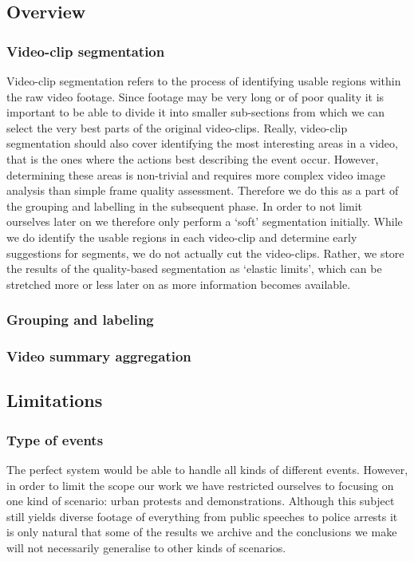 \subsection{Overview}
%
%
\subsubsection{Video-clip segmentation} \label{sec:videoclipsegmentation}
%
Video-clip segmentation refers to the process of identifying usable regions within the raw video footage. Since footage may be very long or of poor quality it is important to be able to divide it into smaller sub-sections from which we can select the very best parts of the original video-clips. Really, video-clip segmentation should also cover identifying the most interesting areas in a video, that is the ones where the actions best describing the event occur. However, determining these areas is non-trivial and requires more complex video image analysis than simple frame quality assessment. Therefore we do this as a part of the grouping and labelling in the subsequent phase. In order to not limit ourselves later on we therefore only perform a ‘soft’ segmentation initially. While we do identify the usable regions in each video-clip and determine early suggestions for segments, we do not actually cut the video-clips. Rather, we store the results of the quality-based segmentation as ‘elastic limits’, which can be stretched more or less later on as more information becomes available.
\subsubsection{Grouping and labeling}
%
%
\subsubsection{Video summary aggregation}
%
%
\subsection{Limitations}
%
\subsubsection{Type of events}
%
The perfect system would be able to handle all kinds of different events. However, in order to limit the scope our work we have restricted ourselves to focusing on one kind of scenario: urban protests and demonstrations. Although this subject still yields diverse footage of everything from public speeches to police arrests it is only natural that some of the results we archive and the conclusions we make will not necessarily generalise to other kinds of scenarios.
%
